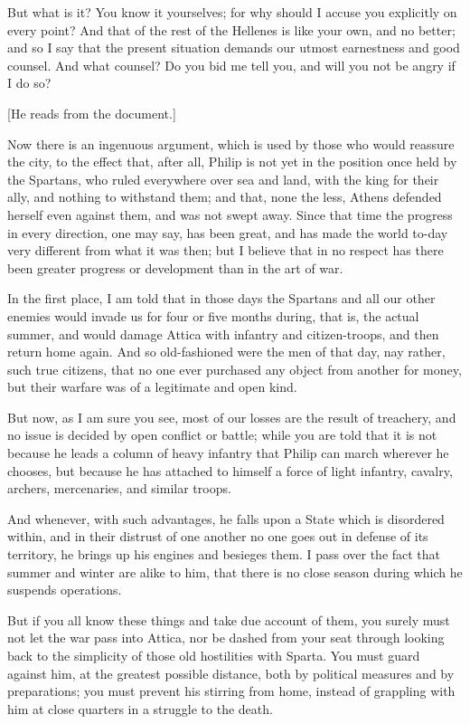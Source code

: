 \documentclass[a4paper]{amsbook}
\begin{document}
But what is it? You know it yourselves; for why should I accuse you explicitly on every point? And that of the rest of the Hellenes is like your own, and no better; and so I say that the present situation demands our utmost earnestness and good counsel. And what counsel? Do you bid me tell you, and will you not be angry if I do so?

[He reads from the document.]

Now there is an ingenuous argument, which is used by those who would reassure the city, to the effect that, after all, Philip is not yet in the position once held by the Spartans, who ruled everywhere over sea and land, with the king for their ally, and nothing to withstand them; and that, none the less, Athens defended herself even against them, and was not swept away. Since that time the progress in every direction, one may say, has been great, and has made the world to-day very different from what it was then; but I believe that in no respect has there been greater progress or development than in the art of war.

In the first place, I am told that in those days the Spartans and all our other enemies would invade us for four or five months during, that is, the actual summer, and would damage Attica with infantry and citizen-troops, and then return home again. And so old-fashioned were the men of that day, nay rather, such true citizens, that no one ever purchased any object from another for money, but their warfare was of a legitimate and open kind.

But now, as I am sure you see, most of our losses are the result of treachery, and no issue is decided by open conflict or battle; while you are told that it is not because he leads a column of heavy infantry that Philip can march wherever he chooses, but because he has attached to himself a force of light infantry, cavalry, archers, mercenaries, and similar troops.

And whenever, with such advantages, he falls upon a State which is disordered within, and in their distrust of one another no one goes out in defense of its territory, he brings up his engines and besieges them. I pass over the fact that summer and winter are alike to him, that there is no close season during which he suspends operations.

But if you all know these things and take due account of them, you surely must not let the war pass into Attica, nor be dashed from your seat through looking back to the simplicity of those old hostilities with Sparta. You must guard against him, at the greatest possible distance, both by political measures and by preparations; you must prevent his stirring from home, instead of grappling with him at close quarters in a struggle to the death.
\end{document}
